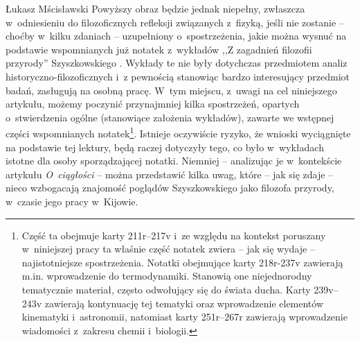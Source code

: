 \begin{artplenv}{Łukasz Mścisławski}
\noindent Powyższy obraz będzie jednak niepełny, zwłaszcza w~odniesieniu do filozoficznych refleksji związanych z~fizyką, jeśli nie zostanie -- choćby w~kilku zdaniach -- uzupełniony o~spostrzeżenia, jakie można wysnuć na podstawie wspomnianych już notatek z~wykładów ,,Z zagadnień filozofii przyrody'' Szyszkowskiego
\parencite[por. ][k. 211–244]{noauthor_noty_1917}. %
 Wykłady te nie były dotychczas przedmiotem analiz historyczno-filozoficznych i~z pewnością stanowiąc bardzo interesujący przedmiot badań, zasługują na osobną pracę. W~tym miejscu, z~uwagi na cel niniejszego artykułu, możemy poczynić przynajmniej kilka spostrzeżeń, opartych o~stwierdzenia ogólne (stanowiące założenia wykładów), zawarte we wstępnej części wspomnianych notatek\footnote{Część ta obejmuje karty 211r–217v i~ze względu na kontekst poruszany w~niniejszej pracy ta właśnie część notatek zwiera -- jak się wydaje -- najistotniejsze spostrzeżenia. Notatki obejmujące karty 218r-237v zawierają m.in. wprowadzenie do termodynamiki. Stanowią one niejednorodny tematycznie materiał, często odwołujący się do świata ducha. Karty 239v–243v zawierają kontynuację tej tematyki oraz wprowadzenie elementów kinematyki i~astronomii, natomiast karty 251r–267r zawierają wprowadzenie wiadomości z~zakresu chemii i~biologii.}. Istnieje oczywiście ryzyko, że wnioski wyciągnięte na podstawie tej lektury, będą raczej dotyczyły tego, co było w~wykładach istotne dla osoby sporządzającej notatki. Niemniej -- analizując je w~kontekście artykułu \textit{O~ciągłości} -- można przedstawić kilka uwag, które -- jak się zdaje -- nieco wzbogacają znajomość poglądów Szyszkowskiego jako filozofa przyrody, w~czasie jego pracy w~Kijowie.


\end{artplenv}
